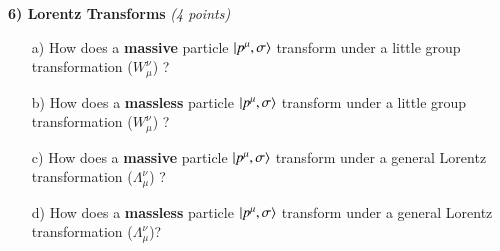 {\vspace{2in}


\textbf{6) Lorentz Transforms } \hfill \textit{(4 points)}\\
\begin{itemize}
\item[a)] How does a \textbf{massive} particle $\ket{p^\mu,\sigma}$ transform under a little group transformation ($W_\mu^\nu$)  ?
\vspace*{1in}
\item[b)] How does a \textbf{massless} particle $\ket{p^\mu,\sigma}$ transform under a little group transformation ($W_\mu^\nu$)  ?
\vspace*{1in}
\item[c)] How does a \textbf{massive} particle $\ket{p^\mu,\sigma}$ transform under a general Lorentz transformation ($\Lambda_\mu^\nu$) ?
\vspace*{1in}
\item[d)] How does a \textbf{massless} particle $\ket{p^\mu,\sigma}$ transform under a general Lorentz transformation ($\Lambda_\mu^\nu$)?
\end{itemize}


\clearpage

%
%
%





}
